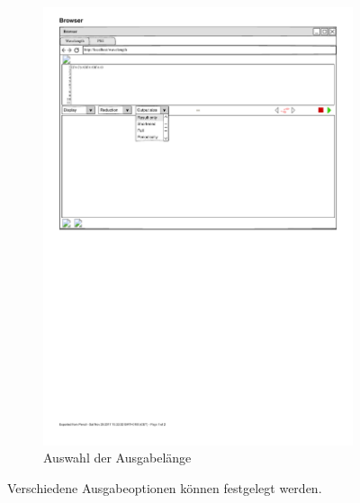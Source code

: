 \documentclass[parskip=full,11pt,twoside]{scrartcl}
\begin{document}
\begin{figure}[H]
\begin{subfigure}[r]{0.25\textwidth}
		\includegraphics{img/outputSizeMenu}
	\caption{Auswahl der Ausgabelänge}	
	\end{subfigure}
	\caption{\label{fig:outputOptions} Verschiedene Ausgabeoptionen können festgelegt werden.}
\end{figure}
\end{document}
